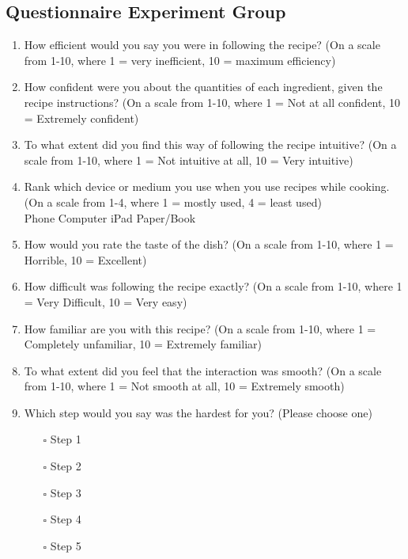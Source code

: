 \subsection{Questionnaire Experiment Group}
\label{app:questionnaire-experiment}
\begin{enumerate}
    \item How efficient would you say you were in following the recipe? (On a scale from 1-10, where 1 = very inefficient, 10 = maximum efficiency)
    
    \item How confident were you about the quantities of each ingredient, given the recipe instructions? (On a scale from 1-10, where 1 = Not at all confident, 10 = Extremely confident)
    
    \item To what extent did you find this way of following the recipe intuitive? (On a scale from 1-10, where 1 = Not intuitive at all, 10 = Very intuitive)
    
    \item Rank which device or medium you use when you use recipes while cooking. (On a scale from 1-4, where 1 = mostly used, 4 = least used)\\
    Phone \hfill Computer \hfill iPad \hfill Paper/Book
    
    \item How would you rate the taste of the dish? (On a scale from 1-10, where 1 = Horrible, 10 = Excellent)
    
    \item How difficult was following the recipe exactly? (On a scale from 1-10, where 1 = Very Difficult, 10 = Very easy)
    
    \item How familiar are you with this recipe? (On a scale from 1-10, where 1 = Completely unfamiliar, 10 = Extremely familiar)
    
    \item To what extent did you feel that the interaction was smooth? (On a scale from 1-10, where 1 = Not smooth at all, 10 = Extremely smooth)
    
    \item Which step would you say was the hardest for you? (Please choose one)\\
    \begin{itemize}
        \item[$\square$] Step 1
        \item[$\square$] Step 2
        \item[$\square$] Step 3
        \item[$\square$] Step 4
        \item[$\square$] Step 5
    \end{itemize}
    

\end{enumerate}
